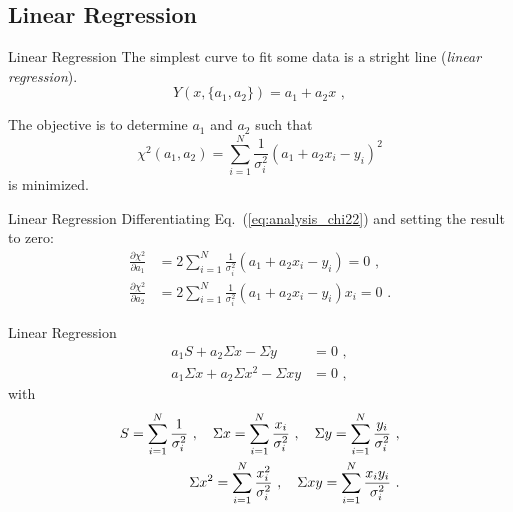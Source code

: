 \documentclass[11pt]{beamer}
\begin{document}
\subsection{Linear Regression}
\begin{frame}[fragile]{Linear Regression}
The simplest curve to fit some data is a stright
line (\emph{linear regression}). \\

\begin{equation}
Y(x, \{a_1,a_2\}) = a_1 + a_2 x\,\,,
\end{equation}

The objective is to determine $a_1$ and $a_2$ such that
\begin{equation}
\chi^2(a_1,a_2) = \sum_{i=1}^N \frac{1}{\sigma_i^2} (a_1 + a_2 x_i - y_i)^2
\label{eq:analysis_chi22}
\end{equation}
is minimized.
\end{frame}

\begin{frame}[fragile]{Linear Regression}
Differentiating Eq.~(\ref{eq:analysis_chi22}) and setting the result to zero:
\begin{equation}
\begin{aligned}
\frac{\partial \chi^2}{\partial a_1} &= 2 \sum_{i=1}^N \frac{1}{\sigma_i^2}(a_1 + a_2x_i - y_i) = 0\,\,,\\
\frac{\partial \chi^2}{\partial a_2} &= 2 \sum_{i=1}^N \frac{1}{\sigma_i^2}(a_1 + a_2 x_i - y_i) x_i = 0\,\,.
\end{aligned}
\end{equation}
\end{frame}

\begin{frame}[fragile]{Linear Regression}
\begin{equation}
\begin{aligned}
a_1 S + a_2 \Sigma x - \Sigma y &= 0\,\,,\\
a_1\Sigma x + a_2 \Sigma x^2 - \Sigma xy &=0\,\,,
\end{aligned}
\end{equation}
with
\begin{equation}
\begin{aligned}
S = \sum_{i=1}^N \frac{1}{\sigma_i^2}\,\,,\hspace*{1em}
\Sigma x = \sum_{i=1}^N \frac{x_i}{\sigma_i^2}\,\,,\hspace{1em}
\Sigma y = \sum_{i=1}^N \frac{y_i}{\sigma_i^2}\,\,,\\
\Sigma x^2 = \sum_{i=1}^N \frac{x_i^2}{\sigma_i^2}\,\,,\hspace{1em}
\Sigma xy = \sum_{i=1}^N \frac{x_i y_i}{\sigma_i^2}\,\,.
\end{aligned}
\end{equation}
\end{frame}
\end{document}
